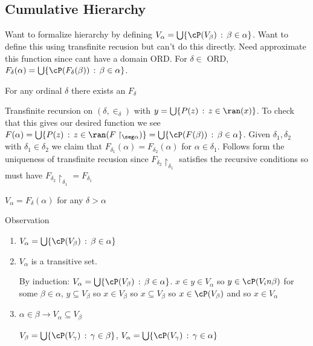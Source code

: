 
\subsection{Cumulative Hierarchy}

Want to formalize hierarchy by defining $V_{\alpha} = \bigcup\{\cP(V_{\beta}) \, : \, \beta \in \alpha\}$. Want to define this using transfinite recusion but can't do this directly. Need approximate this function since cant have a domain ORD. For $\delta \in$ ORD, $F_{\delta}(\alpha) = \bigcup\{\cP(F_{\delta}(\beta)) \, : \, \beta \in \alpha\}$.

\begin{theorem}
    For any ordinal $\delta$ there exists an $F_{\delta}$ 
\end{theorem}

\begin{pf}
    Transfinite recursion on $(\delta, \in_{\delta})$ with $y = \bigcup\{P(z) \, : \, z \in \ran(x)\}$. To check that this gives our desired function we see $F(\alpha) = \bigcup\{P(z) \, : \, z \in \ran(F\upharpoonright_{\seg \alpha})\} = \bigcup \{\cP(F(\beta)) \, : \, \beta \in \alpha\}$. Given $\delta_1, \delta_2$ with $\delta_1 \in \delta_2$ we claim that $F_{\delta_1}(\alpha) = F_{\delta_2}(\alpha)$ for $\alpha \in \delta_1$. Follows form the uniqueness of transfinite recusion since $F_{\delta_2} \upharpoonright_{\delta_1}$ satisfies the recursive conditions so must have $F_{\delta_2} \upharpoonright_{\delta_1} = F_{\delta_1}$ 
\end{pf}

\begin{definition}
    $V_{\alpha} = F_{\delta}(\alpha)$ for any $\delta > \alpha$ 
\end{definition}

\noindent
Observation
\begin{enumerate}[label = (\roman*)]
    \item $V_{\alpha} = \bigcup \{\cP(V_{\beta}) \,  : \, \beta \in \alpha\}$ 
    \item $V_{\alpha}$ is a transitive set. 
    \begin{pf}
        By induction: $V_{\alpha} = \bigcup \{\cP(V_{\beta}) \, : \, \beta \in \alpha\}$. $x \in y \in V_{\alpha}$ so $y \in \cP(V_in {\beta})$ for some $\beta \in \alpha$, $y \subseteq V_{\beta}$ so $x \in V_{\beta}$ so $x \subseteq V_{\beta}$ so $x \in \cP(V_{\beta})$ and so $x \in V_{\alpha}$ 
    \end{pf}
    \item $\alpha \in \beta \to V_{\alpha} \subseteq V_{\beta}$ 
    \begin{pf}
        $V_{\beta} = \bigcup \{\cP(V_{\gamma}) \, : \, \gamma \in \beta\}$, $V_{\alpha} =  \bigcup \{\cP(V_{\gamma}) \, : \, \gamma \in \alpha\}$
    \end{pf}
\end{enumerate}


